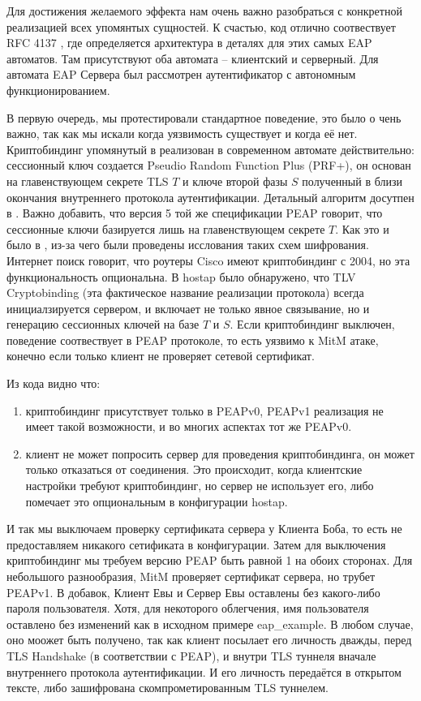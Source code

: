\documentclass[oneside, final, 14pt]{extarticle}
\begin{document}
Для достижения желаемого эффекта нам очень важно разобраться
с конкретной реализацией всех упомянтых сущностей.
К счастью, код отлично соотвествует RFC 4137 \cite{rfc4137},
где определяется архитектура в деталях для этих самых
EAP автоматов.
Там присутствуют оба автомата -- клиентский и серверный.
Для автомата  EAP Сервера был рассмотрен аутентификатор
с автономным функционированием.

В первую очередь, мы протестировали стандартное поведение,
это было о чень важно, так как мы искали когда уязвимость существует
и когда её нет.
Криптобиндинг упомянутый в \cite{tap2002} реализован в современном
автомате действительно:
сессионный ключ создается Pseudio Random Function Plus (PRF+),
он основан на главенствующем секрете  TLS $T$ и ключе второй фазы $S$
полученный в близи окончания внутреннего протокола аутентификации.
Детальный алгоритм досутпен в \cite{josefsson-draft-10}.
Важно добавить, что версия 5 \cite{josefsson-draft-05}
той же спецификации PEAP говорит, что сессионные ключи
базируется лишь на главенствующем секрете $T$.
Как это и было в \cite{tap2002}, из-за чего были проведены исслования
таких схем шифрования.
Интернет поиск говорит, что роутеры Cisco имеют криптобиндинг с 2004,
но эта функциональность опциональна.
В hostap было обнаружено, что TLV Cryptobinding (эта фактическое название
реализации протокола)
всегда инициалзируется сервером,
и включает не только явное связывание,
но и генерацию сессионных ключей на базе $T$ и $S$.
Если криптобиндинг выключен,
поведение соотвествует \cite{josefsson-draft-05} в PEAP протоколе,
то есть уязвимо к MitM атаке,
конечно если только клиент не проверяет сетевой сертификат.

Из кода видно что:
\begin{enumerate}
  \item криптобиндинг присутствует только в PEAPv0,
    PEAPv1 реализация не имеет такой возможности,
    и во многих аспектах тот же PEAPv0.
  \item клиент не может попросить сервер для проведения криптобиндинга,
    он может только отказаться от соединения.
    Это происходит, когда клиентские настройки требуют криптобиндинг,
    но сервер не использует его, либо помечает это опциональным
    в конфигурации hostap.
\end{enumerate}

И так мы выключаем проверку сертификата сервера у Клиента Боба,
то есть не предоставляем никакого сетификата в конфигурации.
Затем для выключения криптобиндинг мы требуем версию PEAP
быть равной 1 на обоих сторонах.
Для небольшого разнообразия, MitM проверяет сертификат сервера,
но трубет PEAPv1.
В добавок, Клиент Евы и Сервер Евы оставлены без какого-либо
пароля пользователя.
Хотя, для некоторого облегчения,
имя пользователя оставлено без изменений
как в исходном примере  eap\_example.
В любом случае, оно моожет быть получено, так как клиент
посылает его личность дважды,
перед TLS Handshake (в соответствии с PEAP),
и внутри TLS туннеля вначале внутреннего протокола аутентификации.
И его личность передаётся в открытом тексте, либо зашифрована
скомпрометированным TLS туннелем.
\end{document}
